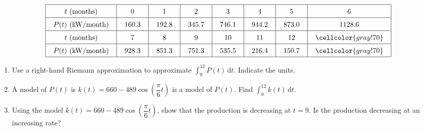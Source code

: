  \begin{align*}
    \arraycolsep=11pt\def\arraystretch{1.5}
    \begin{array}{|c|c|c|c|c|c|c|c|}
        \hline
        t \text{ (months)} & 0 & 1 & 2 & 3 & 4 & 5 & 6 \\ \hline
        P(t) \text{ (kW/month)} & 160.3 & 192.8 & 345.7 & 746.1 & 944.2 & 873.0 & 1128.6 \\ \hline
        t \text{ (months)} & 7 & 8 & 9 & 10 & 11 & 12 & \cellcolor{gray!70} \\ \hline
        P(t) \text{ (kW/month)} & 928.3 & 851.3 & 751.3 & 535.5 & 216.4 & 150.7 & \cellcolor{gray!70} \\
        \hline 
    \end{array}
\end{align*}
\begin{enumerate}[label=\hspace{11pt}(\alph*), align=left, leftmargin=*, labelsep=0.25em]
    \item Use a right-hand Riemann approximation to approximate $\int_0^{12} P(t) \,\mathrm{d}t$. Indicate the units.
    \item A model of $P(t)$ is $k(t) = 660 - 489\cos \left(\dfrac{\pi}{6}t\right)$ is a model of $P(t)$. Find $\int_0^{12} k(t) \,\mathrm{d}t$.
    \item Using the model $k(t) = 660 - 489\cos\left(\dfrac{\pi}{6}t\right)$, show that the production is decreasing at $t = 9$. Is the production decreasing at an increasing rate?
\end{enumerate} \vspace{11pt}

